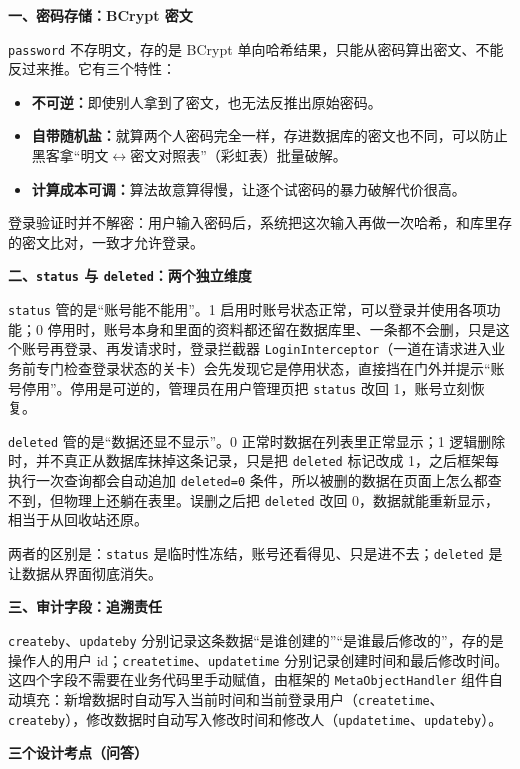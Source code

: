 \documentclass[zihao=-4,UTF8,openany]{ctexart}
\renewcommand{\_}{\textunderscore\allowbreak}
\begin{document}
\noindent\textbf{一、密码存储：BCrypt 密文}

\texttt{password} 不存明文，存的是 BCrypt 单向哈希结果，只能从密码算出密文、不能反过来推。它有三个特性：

\begin{itemize}
\item \textbf{不可逆：}即使别人拿到了密文，也无法反推出原始密码。
\item \textbf{自带随机盐：}就算两个人密码完全一样，存进数据库的密文也不同，可以防止黑客拿“明文$\leftrightarrow$密文对照表”（彩虹表）批量破解。
\item \textbf{计算成本可调：}算法故意算得慢，让逐个试密码的暴力破解代价很高。
\end{itemize}

登录验证时并不解密：用户输入密码后，系统把这次输入再做一次哈希，和库里存的密文比对，一致才允许登录。

\noindent\textbf{二、\texttt{status} 与 \texttt{deleted}：两个独立维度}

\texttt{status} 管的是“账号能不能用”。1 启用时账号状态正常，可以登录并使用各项功能；0 停用时，账号本身和里面的资料都还留在数据库里、一条都不会删，只是这个账号再登录、再发请求时，登录拦截器 \texttt{LoginInterceptor}（一道在请求进入业务前专门检查登录状态的关卡）会先发现它是停用状态，直接挡在门外并提示“账号停用”。停用是可逆的，管理员在用户管理页把 \texttt{status} 改回 1，账号立刻恢复。

\texttt{deleted} 管的是“数据还显不显示”。0 正常时数据在列表里正常显示；1 逻辑删除时，并不真正从数据库抹掉这条记录，只是把 \texttt{deleted} 标记改成 1，之后框架每执行一次查询都会自动追加 \texttt{deleted=0} 条件，所以被删的数据在页面上怎么都查不到，但物理上还躺在表里。误删之后把 \texttt{deleted} 改回 0，数据就能重新显示，相当于从回收站还原。

两者的区别是：\texttt{status} 是临时性冻结，账号还看得见、只是进不去；\texttt{deleted} 是让数据从界面彻底消失。

\noindent\textbf{三、审计字段：追溯责任}

\texttt{create\_by}、\texttt{update\_by} 分别记录这条数据“是谁创建的”“是谁最后修改的”，存的是操作人的用户 id；\texttt{create\_time}、\texttt{update\_time} 分别记录创建时间和最后修改时间。这四个字段不需要在业务代码里手动赋值，由框架的 \texttt{MetaObjectHandler} 组件自动填充：新增数据时自动写入当前时间和当前登录用户（\texttt{create\_time}、\texttt{create\_by}），修改数据时自动写入修改时间和修改人（\texttt{update\_time}、\texttt{update\_by}）。

\noindent\textbf{三个设计考点（问答）}
\end{document}
